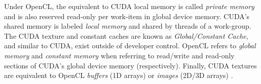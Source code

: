\documentclass{report}
\begin{document}


%



Under OpenCL, the equivalent to CUDA local memory is called \textit{private memory} and is also reserved read-only per work-item in global device memory. CUDA's shared memory is labeled \textit{local memory} and shared by threads of a work-group. The CUDA texture and constant caches are known as \textit{Global/Constant Cache}, and similar to CUDA, exist outside of developer control. OpenCL refers to \textit{global memory} and \textit{constant memory} when referring to read/write and read-only sections of CUDA's global device memory (respectively). Finally, CUDA textures are equivalent to OpenCL \textit{buffers} (1D arrays) or \textit{images} (2D/3D arrays) \cite{OpenCL:2009}.
\end{document}
